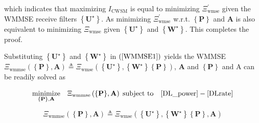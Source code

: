 \documentclass[10pt,journal]{IEEEtran}
\newcommand{\paren}[1]{\left({#1}\right)}
\newcommand{\bracket}[1]{{\left [{#1}\right ]}}
\newcommand{\braces}[1]{{\left\{ {#1}\right\}}}
\newcommand{\rr}{_\mathrm{r}}
\newcommand{\B}{\textrm{B}}
\newcommand{\WBj}{\mathbf{W}_{\mathrm{d},j}\bracket{k}}
\theoremstyle{definition}
\begin{document}
\begin{IEEEproof}

which indicates that maximizing $\mathit{I}_{\textrm{CWSM}}$ is equal to minimizing $\Xi^\prime_{\textrm{wmse}}$ given the WMMSE receive filters $\braces{\mathbf{U}^\star}$. As minimizing $\Xi^\prime_{\textrm{wmse}}$ w.r.t. $\braces{\mathbf{P}}$ and $\mathbf{A}$ is also equivalent to minimizing $\Xi_{\textrm{wmse}}$ given $\braces{\mathbf{U}^\star}$ and $\braces{\mathbf{W}^\star}$. 
This completes the proof. %
\end{IEEEproof}	
Substituting $\braces{\mathbf{U}^\star}$ and $\braces{\mathbf{W}^\star}$ in $\paren{\ref{WMMSE1}}$ yields the WMMSE  $\Xi_{\textrm{wmmse}}\paren{\braces{\mathbf{P}},\mathbf{A}}\triangleq\Xi_{\textrm{wmse}}\paren{\braces{\mathbf{U}^\star}, \braces{\mathbf{W}^\star} \braces{\mathbf{P}}}$, $\mathbf{A}$ and $\braces{\mathbf{P}}$ and $\mathrm{A}$ can be readily solved as \par\noindent\small
\begin{equation}
\label{WMMSE2}
\underset{{\braces{\mathbf{P}},\mathbf{A}}}{\textrm{minimize}}\quad\Xi_{\textrm{wmmse}}\paren{\braces{\mathbf{P}},\mathbf{A}}\;\textrm{subject to}\quad \eqref{DL_power}-\eqref{DLrate} %
\end{equation}\normalsize%
\iffalse
\par\noindent\small
\begin{equation}
\Xi_{\textrm{wmmse}}\paren{\braces{\mathbf{P}},\mathbf{A}}\triangleq\Xi_{\textrm{wmse}}\paren{\braces{\mathbf{U}^\star}, \braces{\mathbf{W}^\star} \braces{\mathbf{P}},\mathbf{A}}
\end{equation}\normalsize
\end{document}
